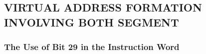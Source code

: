 
\subsection{VIRTUAL ADDRESS FORMATION INVOLVING BOTH SEGMENT}


\subsubsection{The Use of Bit 29 in the Instruction Word}

